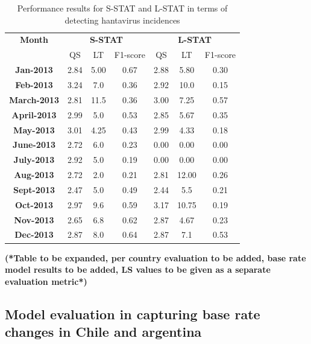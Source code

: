 \documentclass[conference]{IEEEtran}
\begin{document}
\begin{table}
  \caption{Performance results for S-STAT and L-STAT in terms of
  detecting hantavirus incidences}
  \begin{tabular}{|c|c|c|c|c|c|c|}
    \hline
    {\bf Month} & \multicolumn{3}{c|}{{\bf S-STAT}} &
    \multicolumn{3}{c|}{{\bf L-STAT}} \\
    \cline{2-7} & QS & LT & F1-score & QS & LT & F1-score \\
    \hline 
    {\bf Jan-2013} & 2.84 & 5.00 & 0.67 & 2.88 &
                      5.80 & 0.30 \\ 
    \hline
     {\bf Feb-2013} & 3.24 & 7.0 & 0.36 & 2.92 &
                      10.0 & 0.15 \\ 
    \hline
    {\bf March-2013} & 2.81 & 11.5 & 0.36 & 3.00 &
          7.25 & 0.57 \\ 
    \hline
    {\bf April-2013} & 2.99 & 5.0 & 0.53 & 2.85 &
                      5.67 & 0.35 \\ 
    \hline
    {\bf May-2013} & 3.01 & 4.25 & 0.43 & 2.99 &
                      4.33 & 0.18 \\ 
    \hline
    {\bf June-2013} & 2.72 & 6.0 & 0.23 & 0.00 &
                      0.00 & 0.00 \\ 
    \hline
    {\bf July-2013} & 2.92 & 5.0 & 0.19 & 0.00 &
                      0.00 & 0.00 \\ 
    \hline
    {\bf Aug-2013} & 2.72 & 2.0 & 0.21 & 2.81 &
                      12.00 & 0.26 \\ 
    \hline
    {\bf Sept-2013} & 2.47 & 5.0 & 0.49 & 2.44 &
                      5.5 & 0.21 \\ 
    \hline
    {\bf Oct-2013} & 2.97 & 9.6 & 0.59 & 3.17 &
                      10.75 & 0.19 \\ 
    \hline
    {\bf Nov-2013} & 2.65 & 6.8 & 0.62 & 2.87 &
                      4.67 & 0.23 \\ 
    \hline
    {\bf Dec-2013} & 2.87 & 8.0 & 0.64 & 2.87 &
                      7.1 & 0.53 \\ 
    \hline

  \end{tabular}
  \label{tab:results}
\end{table}

{\bf (*Table to be expanded, per country evaluation to be added, base rate
model results to be added, LS values to be given as a separate
evaluation metric*)}

\subsection{Model evaluation in capturing base rate changes in Chile and
argentina}
\end{document}
